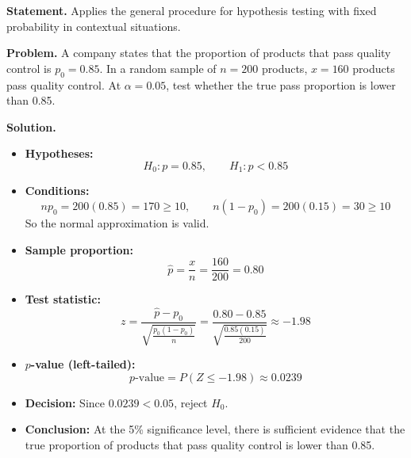 



\begin{ExamProblems}
\item
\textbf{Statement.} Applies the general procedure for hypothesis testing with fixed probability in contextual situations.

\textbf{Problem.} A company states that the proportion of products that pass quality control is \(p_0=0.85\). In a random sample of \(n=200\) products, \(x=160\) products pass quality control. At \(\alpha=0.05\), test whether the true pass proportion is lower than 0.85.

\textbf{Solution.}
\begin{itemize}
    \item \textbf{Hypotheses:}
    \[
    H_0\colon p=0.85,\qquad H_1\colon p<0.85
    \]

    \item \textbf{Conditions:}
    \[
    np_0=200(0.85)=170\ge 10,\qquad n(1-p_0)=200(0.15)=30\ge 10
    \]
    So the normal approximation is valid.

    \item \textbf{Sample proportion:}
    \[
    \hat p=\frac{x}{n}=\frac{160}{200}=0.80
    \]

    \item \textbf{Test statistic:}
    \[
    z=\frac{\hat p-p_0}{\sqrt{\frac{p_0(1-p_0)}{n}}}
    =\frac{0.80-0.85}{\sqrt{\frac{0.85(0.15)}{200}}}
    \approx -1.98
    \]

    \item \textbf{\(p\)-value (left-tailed):}
    \[
    p\text{-value}=P(Z\le -1.98)\approx 0.0239
    \]

    \item \textbf{Decision:} Since \(0.0239<0.05\), reject \(H_0\).

    \item \textbf{Conclusion:} At the 5\% significance level, there is sufficient evidence that the true proportion of products that pass quality control is lower than 0.85.
\end{itemize}
\end{ExamProblems}


